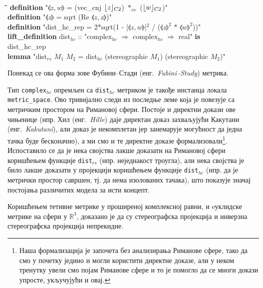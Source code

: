{\tt
\begin{tabbing}
\hspace{5mm}\=\hspace{5mm}\=\hspace{5mm}\=\hspace{5mm}\=\hspace{5mm}\=\kill
\textbf{definition} "$\llangle z, w \rrangle$ = (vec\_cnj $\lfloor z\rfloor_{C2}$) $*_{vv}$ ($\lfloor w\rfloor_{C2}$)"\\
\textbf{definition} "$\llangle z \rrangle$ = sqrt (Re $\llangle z, z\rrangle$)"\\
\textbf{definition} "dist\_hc\_rep = 2*sqrt(1 - |$\llangle z,w \rrangle$|$^2$ / ($\llangle z \rrangle^2$ $*$ $\llangle w \rrangle^2$))"\\
\textbf{lift\_definition} dist$_{hc}$ :: "complex$_{hc}$ $\Rightarrow$ complex$_{hc}$ $\Rightarrow$ real" \textbf{is} \\
\>dist\_hc\_rep\\
\textbf{lemma} "dist$_{rs}$ $M_1$ $M_2$ = dist$_{hc}$ (stereographic $M_1$) (stereographic $M_2$)"
\end{tabbing}
}
\noindent Понекад се ова форма зове Фубини--Стади
(енг.~\emph{Fubini--Study}) метрика.

Тип {\tt complex$_{hc}$} опремљен са {\tt dist$_{hc}$} метриком је
такође инстанца локала {\tt metric\_space}.  Ово тривијално следи из
последње леме која је повезује са метричким простором на Римановој
сфери. Постоје и директни докази ове чињенице (нпр. Хил
(енг.~\emph{Hille}) \cite{hille} даје директан доказ захваљујући
Какутани (енг.~\emph{Kakutani}), али доказ је некомплетан јер
занемарује могућност да једна тачка буде бесконачно), а ми смо и те
директне доказе формализовали\footnote{Наша формализација је започета
  без анализирања Риманове сфере, тако да смо у почетку једино и могли
  користити директне доказе, али у неком тренутку увели смо појам
  Риманове сфере и то је помогло да се многи докази упросте,
  укључујући и овај.}. Испоставило се да је нека својства лакше
доказати на Римановој сфери коришћењем функције {\tt dist$_{rs}$}
(нпр. неједнакост троугла), али нека својства је било лакше доказати у
пројекцији коришћењем функције {\tt dist$_{hc}$} (нпр. да је метрички
простор савршен, тј. да нема изолованих тачака), што показује значај
постојања различитих модела за исти концепт.

Коришћењем тетивне метрике у проширеној комплексној равни, и eуклидске
метрике на сфери у $\mathbb{R}^3$, доказано је да су стереографска
пројекција и инверзна стереографска пројекција непрекидне.

